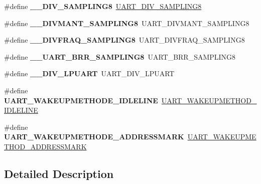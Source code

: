 \begin{DoxyCompactItemize}
\item 
\mbox{\label{group___h_a_l___u_a_r_t___aliased___defines_ga5cba2faadc25e5ece57cd3322adf4151}} 
\#define {\bfseries \+\_\+\+\_\+\+D\+I\+V\+\_\+\+S\+A\+M\+P\+L\+I\+N\+G8}~\hyperlink{group___u_a_r_t___private___macros_ga3b4ab2ec164132268de4719de4625a82}{U\+A\+R\+T\+\_\+\+D\+I\+V\+\_\+\+S\+A\+M\+P\+L\+I\+N\+G8}
\item 
\mbox{\label{group___h_a_l___u_a_r_t___aliased___defines_ga79e617709be4f56d9a327ca3a7dc316f}} 
\#define {\bfseries \+\_\+\+\_\+\+D\+I\+V\+M\+A\+N\+T\+\_\+\+S\+A\+M\+P\+L\+I\+N\+G8}~U\+A\+R\+T\+\_\+\+D\+I\+V\+M\+A\+N\+T\+\_\+\+S\+A\+M\+P\+L\+I\+N\+G8
\item 
\mbox{\label{group___h_a_l___u_a_r_t___aliased___defines_gac09eaea0db063364f5aac90f47791989}} 
\#define {\bfseries \+\_\+\+\_\+\+D\+I\+V\+F\+R\+A\+Q\+\_\+\+S\+A\+M\+P\+L\+I\+N\+G8}~U\+A\+R\+T\+\_\+\+D\+I\+V\+F\+R\+A\+Q\+\_\+\+S\+A\+M\+P\+L\+I\+N\+G8
\item 
\mbox{\label{group___h_a_l___u_a_r_t___aliased___defines_ga446f5df9b1c7c4f2bded186402dd4e62}} 
\#define {\bfseries \+\_\+\+\_\+\+U\+A\+R\+T\+\_\+\+B\+R\+R\+\_\+\+S\+A\+M\+P\+L\+I\+N\+G8}~U\+A\+R\+T\+\_\+\+B\+R\+R\+\_\+\+S\+A\+M\+P\+L\+I\+N\+G8
\item 
\mbox{\label{group___h_a_l___u_a_r_t___aliased___defines_gaa81cd3c42fac5a329fd499964658c20e}} 
\#define {\bfseries \+\_\+\+\_\+\+D\+I\+V\+\_\+\+L\+P\+U\+A\+RT}~U\+A\+R\+T\+\_\+\+D\+I\+V\+\_\+\+L\+P\+U\+A\+RT
\item 
\mbox{\label{group___h_a_l___u_a_r_t___aliased___defines_gab6e73a11dc29f715c2f3e48df9d9f30f}} 
\#define {\bfseries U\+A\+R\+T\+\_\+\+W\+A\+K\+E\+U\+P\+M\+E\+T\+H\+O\+D\+E\+\_\+\+I\+D\+L\+E\+L\+I\+NE}~\hyperlink{group___u_a_r_t___wake_up___methods_ga2411ed44c5d82db84c5819e1e2b5b8b3}{U\+A\+R\+T\+\_\+\+W\+A\+K\+E\+U\+P\+M\+E\+T\+H\+O\+D\+\_\+\+I\+D\+L\+E\+L\+I\+NE}
\item 
\mbox{\label{group___h_a_l___u_a_r_t___aliased___defines_ga0535d8a60a1563f7216a0f4b62a39c43}} 
\#define {\bfseries U\+A\+R\+T\+\_\+\+W\+A\+K\+E\+U\+P\+M\+E\+T\+H\+O\+D\+E\+\_\+\+A\+D\+D\+R\+E\+S\+S\+M\+A\+RK}~\hyperlink{group___u_a_r_t___wake_up___methods_ga4c6935f26f8f2a9fe70fd6306a9882cb}{U\+A\+R\+T\+\_\+\+W\+A\+K\+E\+U\+P\+M\+E\+T\+H\+O\+D\+\_\+\+A\+D\+D\+R\+E\+S\+S\+M\+A\+RK}
\end{DoxyCompactItemize}


\subsection{Detailed Description}
